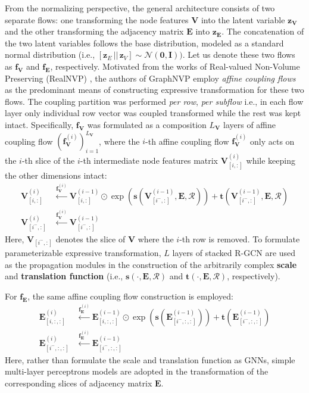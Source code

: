 From the normalizing perspective, the general architecture consists of two
separate flows: one transforming the node features $\mathbf{V}$ into the latent
variable $\mathbf{z}_{\mathbf{V}}$ and the other transforming the adjacency
matrix $\mathbf{E}$ into $\mathbf{z}_{\mathbf{E}}$. The concatenation of the two
latent variables follows the base distribution, modeled as a standard normal
distribution (i.e., $[\mathbf{z}_{E}\, ||\, \mathbf{z}_{V}] \sim
\mathcal{N}(\mathbf{0}, \mathbf{I}))$. Let us denote these two flows as
$\mathbf{f}_{\mathbf{V}}$ and $\mathbf{f}_{\mathbf{E}}$, respectively. Motivated
from the works of Real-valued Non-Volume Preserving (RealNVP)
\citep{dinhDensityEstimationUsing2017}, the authors of GraphNVP employ
\textit{affine coupling flows} as the predominant means of constructing
expressive transformation for these two flows. The coupling partition was
performed \textit{per row}, \textit{per subflow} i.e., in each flow layer only
individual row vector was coupled transformed while the rest was kept intact.
Specifically, $\mathbf{f}_{\mathbf{V}}$ was formulated as a composition
$L_{\mathbf{V}}$ layers of affine coupling flow
$(\mathbf{f}_{\mathbf{V}}^{(i)})_{i=1}^{L_{\mathbf{V}}}$, where the $i$-th
affine coupling flow $\mathbf{f}_{\mathbf{V}}^{(i)}$ only acts on the $i$-th
slice of the $i$-th intermediate node features matrix $\mathbf{V}^{(i)}_{[i,:]}$
while keeping the other dimensions intact:
\begin{align*}
  \mathbf{V}^{(i)}_{[i,:]} &\overset{\mathbf{f}_{\mathbf{V}}^{(i)}}{\longleftarrow}
\mathbf{V}^{(i-1)}_{[i,:]} \odot \exp \left(
\mathbf{s}(\mathbf{V}_{[i^-,:]}^{(i-1)}, \mathbf{E}, \mathcal{R})\right) +
\mathbf{t}(\mathbf{V}_{[i^-,:]}^{(i-1)}, \mathbf{E}, \mathcal{R}) \\
  \mathbf{V}^{(i)}_{[i^-,:]} &\overset{\mathbf{f}_{\mathbf{V}}^{(i)}}{\longleftarrow}
\mathbf{V}^{(i-1)}_{[i^-,:]}
\end{align*}
Here, $ \mathbf{V}_{[i^-,:]}$ denotes the slice of $\mathbf{V}$ where the
$i$-th row is removed.
To formulate parameterizable expressive transformation, $L$ layers of stacked R-GCN
\citep{schlichtkrullModelingRelationalData2018} are used as the propagation
modules in the construction of the arbitrarily complex \textbf{scale} and
\textbf{translation function} (i.e., $\mathbf{s}(\cdot, \mathbf{E}, \mathcal{R})$ and
$\mathbf{t}(\cdot, \mathbf{E}, \mathcal{R})$, respectively).

For $\mathbf{f}_{\mathbf{E}}$, the same affine coupling flow construction is
employed:
\begin{align*}
  \mathbf{E}^{(i)}_{[i,:,:]} &\overset{\mathbf{f}_{\mathbf{E}}^{(i)}}{\longleftarrow}
\mathbf{E}^{(i-1)}_{[i,:,:]} \odot \exp \left(
\mathbf{s}(\mathbf{E}_{[i^-,:,:]}^{(i-1)})\right) +
\mathbf{t}(\mathbf{E}_{[i^-,:,:]}^{(i-1)}) \\
  \mathbf{E}^{(i)}_{[i^-,:,:]} &\overset{\mathbf{f}_{\mathbf{E}}^{(i)}}{\longleftarrow}
\mathbf{E}^{(i-1)}_{[i^-,:,:]}
\end{align*}
Here, rather than formulate the scale and translation function as GNNs, simple
multi-layer perceptrons models are adopted in the transformation of the corresponding
slices of adjacency matrix $\mathbf{E}$.

